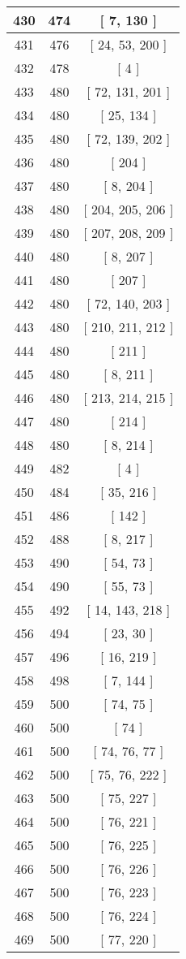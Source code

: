 \begin{center}
\begin{longtable}[H]{|| c c c ||}
\hline
430 & 474 & [ 7, 130 ] \\ 
\hline
431 & 476 & [ 24, 53, 200 ] \\ 
\hline
432 & 478 & [ 4 ] \\ 
\hline
433 & 480 & [ 72, 131, 201 ] \\ 
\hline
434 & 480 & [ 25, 134 ] \\ 
\hline
435 & 480 & [ 72, 139, 202 ] \\ 
\hline
436 & 480 & [ 204 ] \\ 
\hline
437 & 480 & [ 8, 204 ] \\ 
\hline
438 & 480 & [ 204, 205, 206 ] \\ 
\hline
439 & 480 & [ 207, 208, 209 ] \\ 
\hline
440 & 480 & [ 8, 207 ] \\ 
\hline
441 & 480 & [ 207 ] \\ 
\hline
442 & 480 & [ 72, 140, 203 ] \\ 
\hline
443 & 480 & [ 210, 211, 212 ] \\ 
\hline
444 & 480 & [ 211 ] \\ 
\hline
445 & 480 & [ 8, 211 ] \\ 
\hline
446 & 480 & [ 213, 214, 215 ] \\ 
\hline
447 & 480 & [ 214 ] \\ 
\hline
448 & 480 & [ 8, 214 ] \\ 
\hline
449 & 482 & [ 4 ] \\ 
\hline
450 & 484 & [ 35, 216 ] \\ 
\hline
451 & 486 & [ 142 ] \\ 
\hline
452 & 488 & [ 8, 217 ] \\ 
\hline
453 & 490 & [ 54, 73 ] \\ 
\hline
454 & 490 & [ 55, 73 ] \\ 
\hline
455 & 492 & [ 14, 143, 218 ] \\ 
\hline
456 & 494 & [ 23, 30 ] \\ 
\hline
457 & 496 & [ 16, 219 ] \\ 
\hline
458 & 498 & [ 7, 144 ] \\ 
\hline
459 & 500 & [ 74, 75 ] \\ 
\hline
460 & 500 & [ 74 ] \\ 
\hline
461 & 500 & [ 74, 76, 77 ] \\ 
\hline
462 & 500 & [ 75, 76, 222 ] \\ 
\hline
463 & 500 & [ 75, 227 ] \\ 
\hline
464 & 500 & [ 76, 221 ] \\ 
\hline
465 & 500 & [ 76, 225 ] \\ 
\hline
466 & 500 & [ 76, 226 ] \\ 
\hline
467 & 500 & [ 76, 223 ] \\ 
\hline
468 & 500 & [ 76, 224 ] \\ 
\hline
469 & 500 & [ 77, 220 ] \\ 
\hline
\end{longtable}
\end{center}
